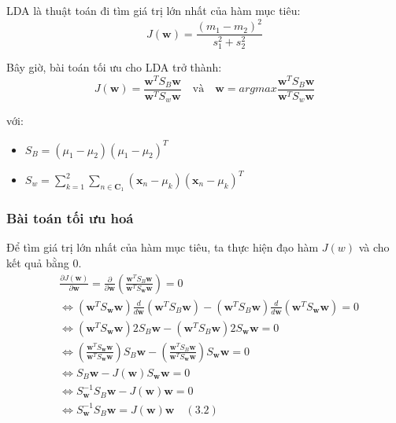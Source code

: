 \documentclass[
  a4paper,
]{article}
\providecommand{\tightlist}{%
  \setlength{\itemsep}{0pt}\setlength{\parskip}{0pt}}
\begin{document}
\begin{enumerate}
  LDA là thuật toán đi tìm giá trị lớn nhất của hàm mục tiêu:
  \[J(\mathbf{w}) = \frac{(m_1 - m_2)^2}{s_1^2+s_2^2} \]

  Bây giờ, bài toán tối ưu cho LDA trở thành:
  \[J(\mathbf{w}) =\frac{\mathbf{w}^TS_B\mathbf{w}}{\mathbf{w} ^TS_w\mathbf{w}} \quad \text{và} \quad \mathbf{w} = argmax \frac{\mathbf{w}^TS_B\mathbf{w}}{\mathbf{w} ^TS_w\mathbf{w}}\]

  với:

  \begin{itemize}
  \tightlist
  \item
    \(S_B=(\mu_1-\mu_2)(\mu_1-\mu_2)^T\)
  \item
    \(S_w = \sum_{k=1}^2\sum_{n \in \mathbf{C}_1}(\mathbf{x}_n-\mu_k)(\mathbf{x}_n-\mu_k)^T\)
  \end{itemize}
\end{enumerate}

\subsubsection{Bài toán tối ưu
hoá}\label{buxe0i-touxe1n-tux1ed1i-ux1b0u-houxe1}

Để tìm giá trị lớn nhất của hàm mục tiêu, ta thực hiện đạo hàm \(J(w)\)
và cho kết quả bằng \(0\). \[
\begin{aligned}
&  \frac{\partial J(\mathbf{w})}{\partial \mathbf{w}}=\frac{\partial}{\partial \mathbf{w}}\left(\frac{\mathbf{w}^T S_B \mathbf{w}}{\mathbf{w}^T S_{\mathbf{w}} \mathbf{w}}\right)=0 \\
& \Leftrightarrow\left(\mathbf{w}^T S_{\mathbf{w}} \mathbf{w}\right) \frac{d}{d \mathbf{w}}\left(\mathbf{w}^T S_B \mathbf{w}\right)-\left(\mathbf{w}^T S_B \mathbf{w}\right) \frac{d}{d \mathbf{w}}\left(\mathbf{w}^T S_{\mathbf{w}} \mathbf{w}\right)=0 \\
& \Leftrightarrow\left(\mathbf{w}^T S_{\mathbf{w}} \mathbf{w}\right) 2 S_B \mathbf{w}-\left(\mathbf{w}^T S_B \mathbf{w}\right) 2 S_{\mathbf{w}} \mathbf{w}=0 \\
& \Leftrightarrow\left(\frac{\mathbf{w}^T S_{\mathbf{w}} \mathbf{w}}{\mathbf{w}^T S_{\mathbf{w}} \mathbf{w}}\right) S_B \mathbf{w}-\left(\frac{\mathbf{w}^T S_B \mathbf{w}}{\mathbf{w}^T S_{\mathbf{w}} \mathbf{w}}\right) S_{\mathbf{w}} \mathbf{w}=0 \\
& \Leftrightarrow S_B \mathbf{w}-J(\mathbf{w}) S_{\mathbf{w}} \mathbf{w}=0 \\
& \Leftrightarrow S_{\mathbf{w}}^{-1} S_B \mathbf{w}-J(\mathbf{w}) \mathbf{w}=0 \\
& \Leftrightarrow S_{\mathbf{w}}^{-1} S_B \mathbf{w}=J(\mathbf{w}) \mathbf{w} \quad (3.2)\\
\end{aligned}
\]
\end{document}
